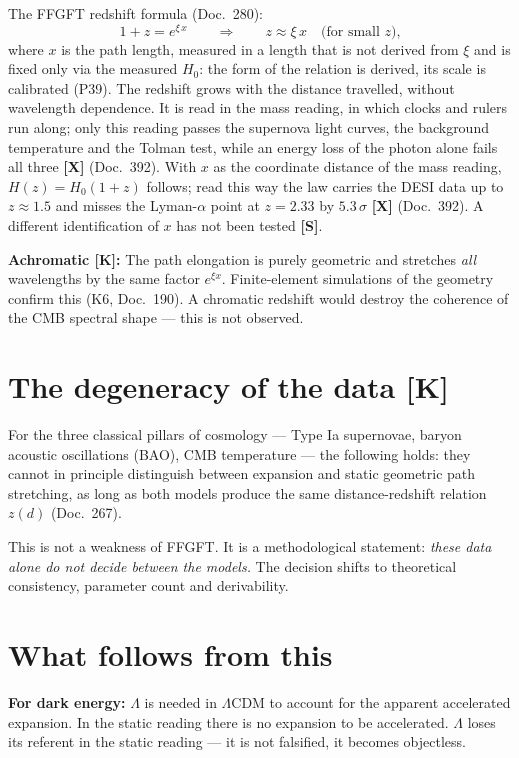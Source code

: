 The FFGFT redshift formula (Doc.~280):
\[
  1 + z = e^{\xi\, x}
  \qquad\Longrightarrow\qquad
  z \approx \xi\, x \quad\text{(for small }z\text{),}
\]
where $x$ is the path length, measured in a length that is not derived
from $\xi$ and is fixed only via the measured $H_0$: the form of the
relation is derived, its scale is calibrated (P39). The redshift grows with the distance
travelled, without wavelength dependence. It is read in the mass reading, in
which clocks and rulers run along; only this reading passes the supernova
light curves, the background temperature and the Tolman test, while an energy
loss of the photon alone fails all three \textbf{[X]} (Doc.~392). With $x$ as the
coordinate distance of the mass reading, $H(z)=H_0(1+z)$ follows; read this way
the law carries the DESI data up to $z\approx1.5$ and misses the Lyman-$\alpha$
point at $z=2.33$ by $5.3\,\sigma$ \textbf{[X]} (Doc.~392). A different
identification of $x$ has not been tested \textbf{[S]}.

\textbf{Achromatic [K]:} The path elongation is purely geometric and
stretches \emph{all} wavelengths by the same factor $e^{\xi x}$.
Finite-element simulations of the geometry confirm this (K6, Doc.~190).
A chromatic redshift would destroy the coherence of the CMB spectral
shape — this is not observed.

\section{The degeneracy of the data [K]}

For the three classical pillars of cosmology — Type Ia supernovae, baryon
acoustic oscillations (BAO), CMB temperature — the following holds:
they cannot in principle distinguish between expansion and static geometric
path stretching, as long as both models produce the same distance-redshift
relation $z(d)$ (Doc.~267).

This is not a weakness of FFGFT. It is a methodological statement:
\emph{these data alone do not decide between the models.}
The decision shifts to theoretical consistency, parameter count and
derivability.

\section{What follows from this}

\textbf{For dark energy:} $\Lambda$ is needed in $\Lambda$CDM to account
for the apparent accelerated expansion. In the static reading there is no
expansion to be accelerated. $\Lambda$ loses its referent in the static
reading — it is not falsified, it becomes objectless.

